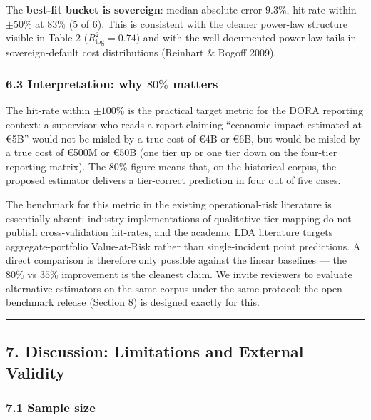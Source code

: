 \documentclass[
]{article}
\begin{document}
The \textbf{best-fit bucket is sovereign}: median absolute error
\(9.3\%\), hit-rate within \(\pm 50\%\) at \(83\%\) (5 of 6). This is
consistent with the cleaner power-law structure visible in Table 2
(\(R^2_{\log} = 0.74\)) and with the well-documented power-law tails in
sovereign-default cost distributions (Reinhart \& Rogoff 2009).

\subsubsection{\texorpdfstring{6.3 Interpretation: why \(80\%\)
matters}{6.3 Interpretation: why 80\textbackslash\% matters}}\label{interpretation-why-80-matters}

The hit-rate within \(\pm 100\%\) is the practical target metric for the
DORA reporting context: a supervisor who reads a report claiming
``economic impact estimated at €5B'' would not be misled by a true cost
of €4B or €6B, but would be misled by a true cost of €500M or €50B (one
tier up or one tier down on the four-tier reporting matrix). The
\(80\%\) figure means that, on the historical corpus, the proposed
estimator delivers a tier-correct prediction in four out of five cases.

The benchmark for this metric in the existing operational-risk
literature is essentially absent: industry implementations of
qualitative tier mapping do not publish cross-validation hit-rates, and
the academic LDA literature targets aggregate-portfolio Value-at-Risk
rather than single-incident point predictions. A direct comparison is
therefore only possible against the linear baselines --- the \(80\%\) vs
\(35\%\) improvement is the cleanest claim. We invite reviewers to
evaluate alternative estimators on the same corpus under the same
protocol; the open-benchmark release (Section 8) is designed exactly for
this.

\begin{center}\rule{0.5\linewidth}{0.5pt}\end{center}

\subsection{7. Discussion: Limitations and External
Validity}\label{discussion-limitations-and-external-validity}

\subsubsection{7.1 Sample size}\label{sample-size}
\end{document}
